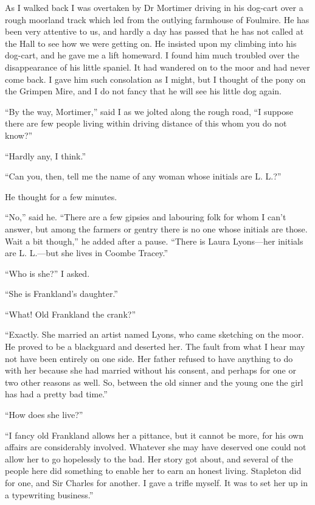 As I walked back I was overtaken by Dr Mortimer driving in his dog-cart over a rough moorland track which led from the outlying farmhouse of Foulmire. He has been very attentive to us, and hardly a day has passed that he has not called at the Hall to see how we were getting on. He insisted upon my climbing into his dog-cart, and he gave me a lift homeward. I found him much troubled over the disappearance of his little spaniel. It had wandered on to the moor and had never come back. I gave him such consolation as I might, but I thought of the pony on the Grimpen Mire, and I do not fancy that he will see his little dog again.

\enquote{By the way, Mortimer,} said I as we jolted along the rough road, \enquote{I suppose there are few people living within driving distance of this whom you do not know?}

\enquote{Hardly any, I think.}

\enquote{Can you, then, tell me the name of any woman whose initials are L. L.?}

He thought for a few minutes.

\enquote{No,} said he. \enquote{There are a few gipsies and labouring folk for whom I can't answer, but among the farmers or gentry there is no one whose initials are those. Wait a bit though,} he added after a pause. \enquote{There is Laura Lyons---her initials are L. L.---but she lives in Coombe Tracey.}

\enquote{Who is she?} I asked.

\enquote{She is Frankland's daughter.}

\enquote{What! Old Frankland the crank?}

\enquote{Exactly. She married an artist named Lyons, who came sketching on the moor. He proved to be a blackguard and deserted her. The fault from what I hear may not have been entirely on one side. Her father refused to have anything to do with her because she had married without his consent, and perhaps for one or two other reasons as well. So, between the old sinner and the young one the girl has had a pretty bad time.}

\enquote{How does she live?}

\enquote{I fancy old Frankland allows her a pittance, but it cannot be more, for his own affairs are considerably involved. Whatever she may have deserved one could not allow her to go hopelessly to the bad. Her story got about, and several of the people here did something to enable her to earn an honest living. Stapleton did for one, and Sir Charles for another. I gave a trifle myself. It was to set her up in a typewriting business.}

